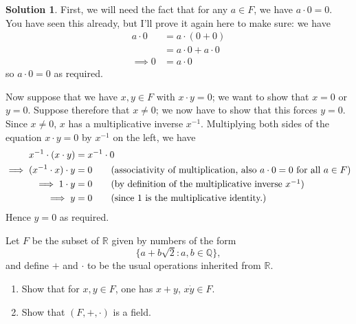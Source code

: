 \documentclass[12pt]{article}
\theoremstyle{definition}
\theoremstyle{definition}
\newtheorem*{soln}{Solution}
\newcommand{\Q}{\mathbb{Q}}
\newcommand{\R}{\mathbb{R}}
\begin{document}
\begin{soln}
First, we will need the fact that for any $a\in F$, we have $a\cdot 0=0$. You have seen this already, but I'll prove it again here to make sure: we have
\begin{align*}
a\cdot 0 &= a \cdot (0+0) \tag{since $0$ is the additive identity}\\
&= a\cdot 0 + a \cdot 0 \tag{by the distributive law}\\
\implies 0 &= a\cdot 0 \tag{adding the additive inverse of $a\cdot 0$ to both sides}
\end{align*}
so $a\cdot 0=0$ as required.

Now suppose that we have $x,y\in F$ with $x\cdot y=0$; we want to show that $x=0$ or $y=0$. Suppose therefore that $x\neq 0$; we now have to show that this forces $y=0$. Since $x\neq 0$, $x$ has a multiplicative inverse $x^{-1}$. Multiplying both sides of the equation $x\cdot y=0$ by $x^{-1}$ on the left, we have
\begin{align*}
x^{-1}\cdot (x\cdot y) &= x^{-1} \cdot 0 \\
\implies (x^{-1}\cdot x)\cdot y &= 0 \tag{associativity of multiplication, also $a\cdot 0=0$ for all $a\in F$}\\
\implies 1\cdot y &= 0 \tag{by definition of the multiplicative inverse $x^{-1}$}\\
\implies y &= 0 \tag{since $1$ is the multiplicative identity.}
\end{align*}
Hence $y=0$ as required.
\end{soln}

\begin{prob}
Let $F$ be the subset of $\R$ given by numbers of the form
\[\{a+b\sqrt{2}:a,b\in\Q\},\]
and define $+$ and $\cdot$ to be the usual operations inherited from $\R$.
\begin{enumerate}[label=(\alph*)]
\item Show that for $x,y\in F$, one has $x+y$, $x\dot y\in F$.

\item Show that $(F,+,\cdot)$ is a field.
\end{enumerate}
\end{prob}
\end{document}
